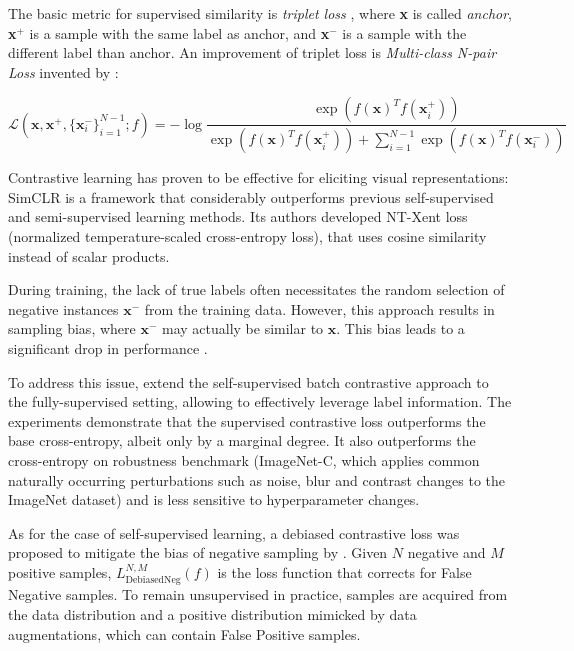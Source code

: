 \documentclass{article}
\begin{document}
The basic metric for supervised similarity is \textit{triplet loss} \citep{Schroff_2015}, where \textbf{x} is called \textit{anchor}, \textbf{x}$^+$ is a sample with the same label as anchor, and \textbf{x}$^-$ is a sample with the different label than anchor. An improvement of triplet loss is \textit{Multi-class N-pair Loss} invented by \citep{NIPS2016_6b180037}:

\begin{equation} \label{eq:1}
\mathcal{L}(\textbf{x}, \textbf{x}^+, \{\textbf{x}_i^-\}_{i=1}^{N-1}; f) = - \log \frac{\exp(f(\textbf{x})^T f(\textbf{x}_i^+))}{\exp(f(\textbf{x})^T f(\textbf{x}_i^+)) + \sum _{i=1}^{N-1} \exp(f(\textbf{x})^Tf(\textbf{x}_i^-))}
\end{equation}

Contrastive learning has proven to be effective for eliciting visual representations: SimCLR \citep{chen2020simple} is a framework that considerably outperforms previous self-supervised and semi-supervised learning methods. Its authors developed NT-Xent loss (normalized temperature-scaled cross-entropy loss), that uses cosine similarity instead of scalar products.

During training, the lack of true labels often necessitates the random selection of negative instances $\textbf{x}^-$ from the training data. However, this approach results in sampling bias, where $\textbf{x}^-$ may actually be similar to $\textbf{x}$. This bias leads to a significant drop in performance \citep{NEURIPS2021_de8aa43e}.

To address this issue, \citep{khosla2021supervised} extend the self-supervised batch contrastive approach to the fully-supervised setting, allowing to effectively leverage label information. The experiments demonstrate that the supervised contrastive loss outperforms the base cross-entropy, albeit only by a marginal degree. It also outperforms the cross-entropy on robustness benchmark (ImageNet-C, which applies common naturally occurring perturbations such as noise, blur and contrast changes to the ImageNet dataset) and is less sensitive to hyperparameter changes.

As for the case of self-supervised learning, a debiased contrastive loss was proposed to mitigate the bias of negative sampling by \citep{chuang2020debiased}. Given $N$ negative and $M$ positive samples, $L^{N, M}_{\text{DebiasedNeg}} (f)$ is the loss function that corrects for False Negative samples. To remain unsupervised in practice, samples are acquired from the data distribution and a positive distribution mimicked by data augmentations, which can contain False Positive samples.
\end{document}
